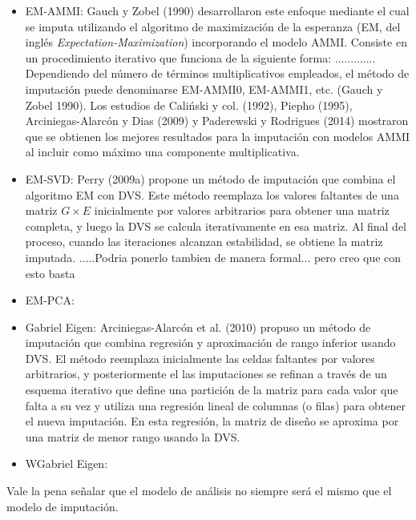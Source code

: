 \begin{itemize}
\item EM-AMMI: Gauch y Zobel (1990) desarrollaron este enfoque mediante el cual se imputa utilizando el algoritmo de maximización de la esperanza (EM, del inglés \emph{Expectation-Maximization}) incorporando el modelo AMMI. Consiste en un procedimiento iterativo que funciona de la siguiente forma: .............
Dependiendo del número de términos multiplicativos empleados, el método de imputación puede denominarse EM-AMMI0, EM-AMMI1, etc. (Gauch y Zobel 1990). Los estudios de Caliński y col. (1992), Piepho (1995), Arciniegas-Alarcón y Dias (2009) y Paderewski y
Rodrigues (2014) mostraron que se obtienen los mejores resultados para la imputación con modelos AMMI al incluir como máximo una componente multiplicativa.
\end{itemize}
\begin{itemize}
\item EM-SVD: Perry (2009a) propone un método de imputación que combina el algoritmo EM con DVS. Este método reemplaza los valores faltantes de una matriz $G \times E$ inicialmente por valores arbitrarios para obtener una matriz completa, y luego la DVS se calcula iterativamente en esa matriz. Al final del proceso, cuando las iteraciones alcanzan estabilidad, se obtiene la matriz imputada.
.....Podria ponerlo tambien de manera formal... pero creo que con esto basta
\end{itemize}
\begin{itemize}
\item EM-PCA:
\end{itemize}
\begin{itemize}
\item Gabriel Eigen: Arciniegas-Alarcón et al. (2010) propuso un método de imputación que combina regresión y aproximación de rango inferior usando DVS. El método reemplaza inicialmente las celdas faltantes por valores arbitrarios, y posteriormente el
las imputaciones se refinan a través de un esquema iterativo que define una partición de la matriz para cada valor que falta a su vez y utiliza una regresión lineal de columnas (o filas) para obtener el nueva imputación. En esta regresión, la matriz de diseño se aproxima por una matriz de menor rango usando la DVS.
\end{itemize}
\begin{itemize}
\item WGabriel Eigen:
\end{itemize}

Vale la pena señalar que el modelo de análisis no siempre será el mismo que el modelo de imputación.





